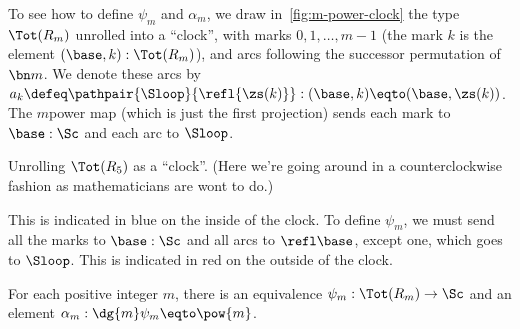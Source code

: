 To see how to define $\psi_m$ and $\alpha_m$,
we draw in~\cref{fig:m-power-clock} the type $\Tot(R_m)$
unrolled into a ``clock'', with marks $0,1,\dots,m-1$
(the mark $k$ is the element $(\base,k):\Tot(R_m)$),
and arcs following the successor permutation of $\bn m$.
We denote these arcs by
$a_k \defeq \pathpair{\Sloop}{\refl{\zs(k)}} : (\base,k) \eqto (\base,\zs(k))$.
The $m$\th power map (which is just the first projection)
sends each mark to $\base:\Sc$ and each arc to $\Sloop$.
\begin{marginfigure}
  \caption{Unrolling $\protect\Tot(R_5)$ as a ``clock''. (Here we're going around in a counterclockwise fashion as mathematicians are wont to do.)}
  \label{fig:m-power-clock}
\end{marginfigure}
This is indicated in blue on the inside of the clock.
To define $\psi_m$, we must send all the marks to $\base:\Sc$
and all arcs to $\refl\base$, except one, which goes to $\Sloop$.
This is indicated in red on the outside of the clock.
\begin{construction}\label{con:psi-alpha-m}
  For each positive integer $m$,
  there is an equivalence $\psi_m : \Tot(R_m) \to \Sc$
  and an element $\alpha_m : \dg{m}\psi_m \eqto \pow{m}$.
\end{construction}
